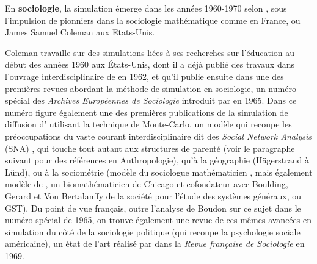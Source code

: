 \medskip
En \textbf{sociologie}, la simulation émerge dans les années 1960-1970 selon \textcites[50]{Manzo2005}[16]{Manzo2007}, sous l'impulsion de pionniers dans la sociologie mathématique comme \textcites{Boudon1967, Gremy1971} en France, ou James Samuel Coleman aux Etats-Unis.

Coleman travaille sur des simulations liées à ses recherches sur l'éducation au début des années 1960 aux États-Unis, dont il a déjà publié des travaux dans l'ouvrage interdisciplinaire de \textcite{Guetzkow1962} en 1962, et qu'il publie ensuite \autocite{Coleman1965} dans une des premières revues abordant la méthode de simulation en sociologie, un numéro spécial des \textit{Archives Européennes de Sociologie} introduit par \textcite{Boudon1965} en 1965. Dans ce  numéro figure également une des premières publications de la simulation de diffusion d'\textcite{Hagerstrand1965} utilisant la technique de Monte-Carlo, un modèle qui recoupe les préoccupations du vaste courant interdisciplinaire dit des \textit{Social Network Analysis} (SNA) \autocite{Bernard2005}, qui touche tout autant aux structures de parenté (voir le paragraphe suivant pour des références en Anthropologie), qu'à la géographie (Hägerstrand à Lünd), ou à la sociométrie (modèle du sociologue mathématicien \textcite{Coleman1957}, mais également modèle de \textcite{Rapoport1961}, un biomathématicien de Chicago et cofondateur avec Boulding, Gerard et Von Bertalanffy de la société pour l'étude des systèmes généraux, ou GST). Du point de vue français, outre l'analyse de Boudon sur ce sujet dans le numéro spécial de 1965, on trouve également une revue de ces mêmes avancées en simulation du côté de la sociologie politique (qui recoupe la psychologie sociale américaine), un état de l'art réalisé par \textcite{Padioleau1969} dans la \textit{Revue française de Sociologie} en 1969.

